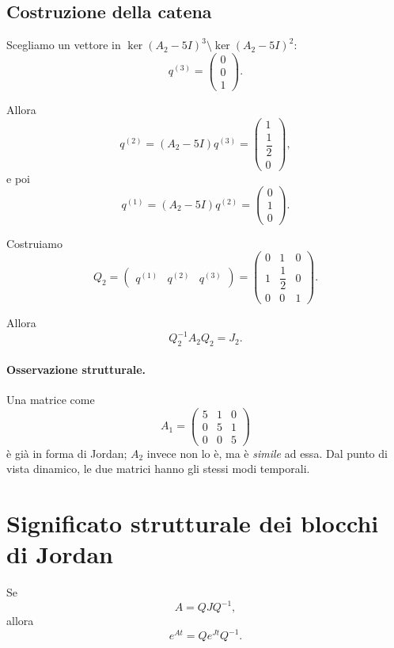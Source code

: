 \subsection*{Costruzione della catena}

Scegliamo un vettore in $\ker(A_2-5I)^3 \setminus \ker(A_2-5I)^2$:
\[
q^{(3)}=
\begin{pmatrix}
0\\
0\\
1
\end{pmatrix}.
\]

Allora
\[
q^{(2)} = (A_2-5I)q^{(3)}
=
\begin{pmatrix}
1\\
\dfrac12\\
0
\end{pmatrix},
\]
e poi
\[
q^{(1)} = (A_2-5I)q^{(2)}
=
\begin{pmatrix}
0\\
1\\
0
\end{pmatrix}.
\]

Costruiamo
\[
Q_2=
\begin{pmatrix}
q^{(1)} & q^{(2)} & q^{(3)}
\end{pmatrix}
=
\begin{pmatrix}
0 & 1 & 0\\
1 & \dfrac12 & 0\\
0 & 0 & 1
\end{pmatrix}.
\]

Allora
\[
Q_2^{-1}A_2Q_2 = J_2.
\]

\paragraph{Osservazione strutturale.}
Una matrice come
\[
A_1=
\begin{pmatrix}
5 & 1 & 0\\
0 & 5 & 1\\
0 & 0 & 5
\end{pmatrix}
\]
è già in forma di Jordan; $A_2$ invece non lo è, ma è \emph{simile} ad essa.  
Dal punto di vista dinamico, le due matrici hanno gli stessi modi temporali.

\section{Significato strutturale dei blocchi di Jordan}

Se
\[
A = QJQ^{-1},
\]
allora
\[
e^{At} = Qe^{Jt}Q^{-1}.
\]

